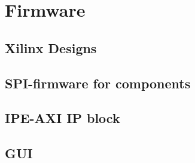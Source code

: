   
\newpage
\section{Firmware}
\subsection{Xilinx Designs}
\subsection{SPI-firmware for components}
\subsection{IPE-AXI IP block}
\subsection{GUI}






